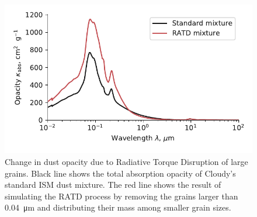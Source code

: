 \begin{figure}
  \centering
  \includegraphics[width=\linewidth]{figs/xsec-dust-ratd-ism_10}
  \caption{Change in dust opacity due to Radiative Torque Disruption
    of large grains.  Black line shows the total absorption opacity of
    Cloudy's standard ISM dust mixture.  The red line shows the result
    of simulating the RATD process by removing the grains larger than
    \SI{0.04}{\um} and distributing their mass among smaller grain
    sizes.}
  \label{fig:ratd}
\end{figure}


